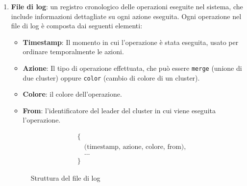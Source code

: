 \documentclass[12pt, a4paper]{report}
\begin{document}
\begin{enumerate}
    \item \textbf{File di log}: un registro cronologico delle operazioni eseguite nel sistema, che include informazioni dettagliate su ogni azione eseguita. Ogni operazione nel file di log \`e composta dai seguenti elementi:
    \begin{itemize}
        \item \textbf{Timestamp}: Il momento in cui l'operazione \`e stata eseguita, usato per ordinare temporalmente le azioni.
        \item \textbf{Azione}: Il tipo di operazione effettuata, che pu\`o essere \texttt{merge} (unione di due cluster) oppure \texttt{color} (cambio di colore di un cluster).
        \item \textbf{Colore}: il colore dell'operazione.
        \item \textbf{From}: l'identificatore del leader del cluster in cui viene eseguita l'operazione.
    \end{itemize}
    \vspace{-20pt}
    \begin{figure}[H]
        \begin{align*}
            &\{ \\
            &\quad \text{(timestamp, azione, colore, from)},\\
            &\quad \ldots\\
            &\}
        \end{align*}
        \vspace{-20pt}
        \caption{Struttura del file di log}
    \end{figure}


\end{enumerate}
\end{document}
